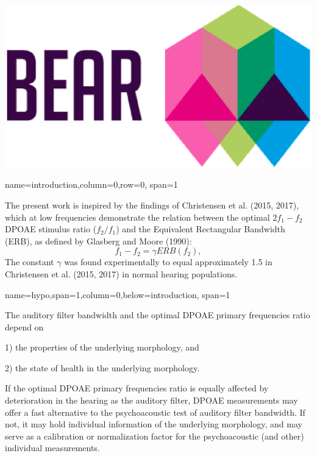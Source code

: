 \documentclass[paperwidth=100cm,paperheight=160cm,portrait,fontscale=0.2941]{baposter}
\begin{document}
\begin{poster}
{}
{
\includegraphics[height=0.06\textheight]{bearLOGO.eps}
}

{name=introduction,column=0,row=0, span=1}
{\parskip 5pt   
    The present work is inspired by the findings of Christensen et al. (2015, 2017), which at low frequencies demonstrate the relation between the optimal $2f_1-f_2$ DPOAE stimulus ratio ($f_2/f_1$) and the Equivalent Rectangular Bandwidth (ERB), as defined by Glasberg and Moore (1990):
    \begin{equation}\label{eq:model}
        f_1 - f_2 = \gamma ERB(f_2),
    \end{equation}
The constant $\gamma$ was found experimentally to equal approximately 1.5 in Christensen et al. (2015, 2017) in normal hearing populations.  

}


{name=hypo,span=1,column=0,below=introduction, span=1}
{\parskip 5pt 
The auditory filter bandwidth  and the optimal DPOAE primary frequencies ratio depend on

1) the properties of the underlying morphology, and

2) the state of health in the underlying morphology.

If the optimal DPOAE primary frequencies ratio is equally affected by deterioration in the hearing as the auditory filter, DPOAE measurements may offer a fast alternative to the psychoacoustic test of auditory filter bandwidth. If not, it may hold individual information of the underlying morphology, and may serve as a calibration or normalization factor for the psychoacoustic (and other) individual measurements.


}
\end{poster}
\end{document}
